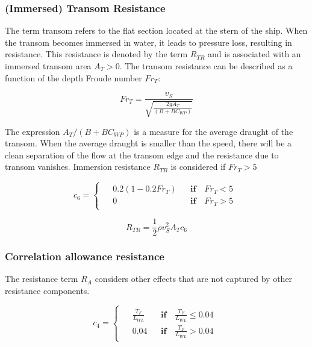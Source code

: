 \subsubsection*{(Immersed) Transom Resistance}

The term transom refers to the flat section located at the stern of the ship. When the transom becomes immersed in water, it leads to pressure loss, resulting in resistance. This resistance is denoted by the term $R_{TR}$ and is associated with an immersed transom area $A_T > 0$. The transom resistance can be described as a function of the depth Froude number $Fr_{T}$:

\begin{equation}
    \label{eqn:Fr_t}
    Fr_T = \frac{v_S}{\sqrt{\frac{2gA_T}{(B+BC_{WP})}}}
\end{equation}

The expression $A_T/(B+BC_{WP})$ is a measure for the average draught of the transom. When the average draught is smaller than the speed, there will be a clean separation of the flow at the transom edge and the resistance due to transom vanishes. Immersion resistance $R_{TR}$ is considered if $Fr_{T} > 5$ 

\begin{equation}
    \label{eqn:c6}
        c_6 = 
        \begin{cases}
            \begin{aligned}
              &0.2(1-0.2Fr_T) && \textbf{if} \quad Fr_T < 5 \\
              & 0 && \textbf{if} \quad Fr_T > 5  
            \end{aligned}
        \end{cases}
\end{equation}

\begin{equation}
    \label{eqn:R_transom}
    R_{TR} = \frac{1}{2}\rho v_S^2 A_T c_6
\end{equation}

\subsubsection*{Correlation allowance resistance}

The resistance term $R_A$ considers other effects that are not captured by other resistance components. 

\begin{equation}
    \label{eqn:c4}
    c_4 =
    \begin{cases}
        \begin{aligned}
            &\frac{T_F}{L_{WL}} && \textbf{if} \quad \frac{T_F}{L_{WL}} \leqslant 0.04 \\
            &0.04 && \textbf{if} \quad \frac{T_F}{L_{WL}} >0.04 
        \end{aligned}
    \end{cases}
\end{equation}

